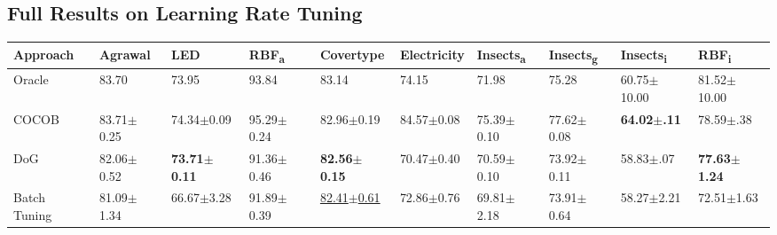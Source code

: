 \documentclass{article} %
\begin{document}
\newpage
\subsection{Full Results on Learning Rate Tuning}\label{app:tuning_results}
\vfill

\captionsetup{hypcap=false}

\begin{center}
   \begin{sideways}
      \begin{minipage}{0.9\textheight}
         \centering
         \small
         \begin{tabular}{llllllllll}
            \toprule
            Approach                       & Agrawal                  & LED                      & RBF\textsubscript{a}     & Covertype                  & Electricity                & Insects\textsubscript{a} & Insects\textsubscript{g}   & Insects\textsubscript{i} & RBF\textsubscript{i}     \\ \midrule
            Oracle                         & 83.70                    & 73.95                    & 93.84                    & 83.14                      & 74.15                      & 71.98                    & 75.28                      & 60.75$\pm$10.00          & 81.52$\pm$10.00          \\
            COCOB                          & 83.71$\pm$0.25           & 74.34$\pm$0.09           & 95.29$\pm$0.24           & 82.96$\pm$0.19             & 84.57$\pm$0.08             & 75.39$\pm$0.10           & 77.62$\pm$0.08             & \bfseries 64.02$\pm$.11  & 78.59$\pm$.38            \\ \midrule
            DoG                            & 82.06$\pm$0.52           & \bfseries 73.71$\pm$0.11 & 91.36$\pm$0.46           & \bfseries 82.56$\pm$0.15   & 70.47$\pm$0.40             & 70.59$\pm$0.10           & 73.92$\pm$0.11             & 58.83$\pm$.07            & \bfseries 77.63$\pm$1.24 \\
            Batch Tuning                   & 81.09$\pm$1.34           & 66.67$\pm$3.28           & 91.89$\pm$0.39           & \underline{82.41$\pm$0.61} & 72.86$\pm$0.76             & 69.81$\pm$2.18           & 73.91$\pm$0.64             & 58.27$\pm$2.21           & 72.51$\pm$1.63           \\

\end{tabular}
\end{minipage}
\end{sideways}
\end{center}
\end{document}
